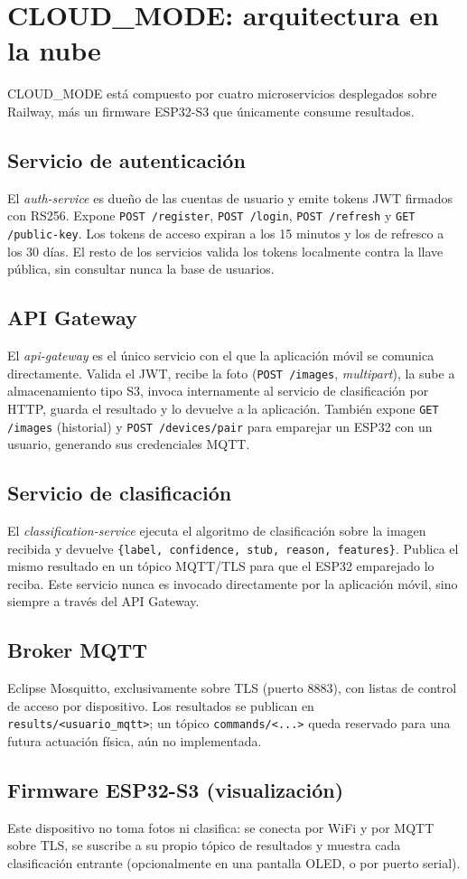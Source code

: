 \section{CLOUD\_MODE: arquitectura en la nube}
\label{sec:cloud_mode}

CLOUD\_MODE está compuesto por cuatro microservicios desplegados sobre
Railway, más un firmware ESP32-S3 que únicamente consume resultados.

\subsection{Servicio de autenticación}
El \textit{auth-service} es dueño de las cuentas de usuario y emite
tokens JWT firmados con RS256. Expone \texttt{POST /register},
\texttt{POST /login}, \texttt{POST /refresh} y \texttt{GET
/public-key}. Los tokens de acceso expiran a los 15 minutos y los de
refresco a los 30 días. El resto de los servicios valida los tokens
localmente contra la llave pública, sin consultar nunca la base de
usuarios.

\subsection{API Gateway}
El \textit{api-gateway} es el único servicio con el que la aplicación
móvil se comunica directamente. Valida el JWT, recibe la foto
(\texttt{POST /images}, \textit{multipart}), la sube a almacenamiento
tipo S3, invoca internamente al servicio de clasificación por HTTP,
guarda el resultado y lo devuelve a la aplicación. También expone
\texttt{GET /images} (historial) y \texttt{POST /devices/pair} para
emparejar un ESP32 con un usuario, generando sus credenciales MQTT.

\subsection{Servicio de clasificación}
El \textit{classification-service} ejecuta el algoritmo de
clasificación sobre la imagen recibida y devuelve
\texttt{\{label, confidence, stub, reason, features\}}. Publica el
mismo resultado en un tópico MQTT/TLS para que el ESP32 emparejado lo
reciba. Este servicio nunca es invocado directamente por la aplicación
móvil, sino siempre a través del API Gateway.

\subsection{Broker MQTT}
Eclipse Mosquitto, exclusivamente sobre TLS (puerto 8883), con listas
de control de acceso por dispositivo. Los resultados se publican en
\texttt{results/<usuario\_mqtt>}; un tópico
\texttt{commands/<...>} queda reservado para una futura actuación
física, aún no implementada.

\subsection{Firmware ESP32-S3 (visualización)}
Este dispositivo no toma fotos ni clasifica: se conecta por WiFi y por
MQTT sobre TLS, se suscribe a su propio tópico de resultados y muestra
cada clasificación entrante (opcionalmente en una pantalla OLED, o por
puerto serial).
